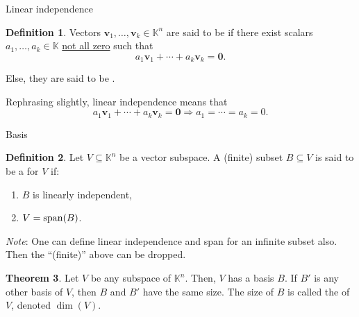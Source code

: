 \documentclass[dvipsnames]{beamer}
\theoremstyle{definition}
\newtheorem{thm}{Theorem}
\newtheorem{defn}[thm]{Definition}
\let\subset\subseteq
\begin{document}
\begin{frame}{Linear independence}
    \begin{defn}
        Vectors $\mathbf{v}_{1}, \ldots, \mathbf{v}_{k} \in \mathbb{K}^{n}$ are said to be  \pause if there exist scalars $a_{1}, \ldots, a_{k} \in \mathbb{K}$ \underline{not all zero} such that
        \begin{equation*} 
            a_{1} \mathbf{v}_{1} + \cdots + a_{k} \mathbf{v}_{k} = \mathbf{0}.
        \end{equation*} \pause

        Else, they are said to be .
    \end{defn} \pause

    Rephrasing slightly, linear independence means that
    \begin{equation*} 
        a_{1} \mathbf{v}_{1} + \cdots + a_{k} \mathbf{v}_{k} = \mathbf{0} \Rightarrow a_{1} = \cdots = a_{k} = 0.
    \end{equation*} 
\end{frame}
\begin{frame}{Basis}
    \begin{defn}
        Let $V \subset \mathbb{K}^{n}$ be a vector subspace. \pause A (finite) subset $B \subset V$ is said to be a  for $V$ if: \pause
        \begin{enumerate}[<+->]
            \item $B$ is linearly independent,
            \item $V = \operatorname{span}(B)$.
        \end{enumerate}
    \end{defn} \pause
    \emph{Note}: One can define linear independence and span for an infinite subset also. Then the ``(finite)'' above can be dropped. \pause

    \begin{thm}
        Let $V$ be any subspace of $\mathbb{K}^{n}$. \pause \newline
        Then, $V$ has a basis $B$. \pause If $B'$ is any other basis of $V$, then $B$ and $B'$ have the same size. \pause \newline
        The size of $B$ is called the  of $V$, denoted $\dim(V)$.
    \end{thm}
\end{frame}
\end{document}
